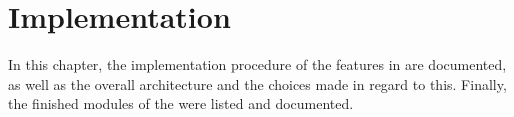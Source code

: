 \chapter{Implementation} \label{cha:implementation}

In this chapter, the implementation procedure of the features in  are documented, as well as the overall architecture and the choices made in regard to this. Finally, the finished modules of the \projname{} were listed and documented.









%
%
%

%
